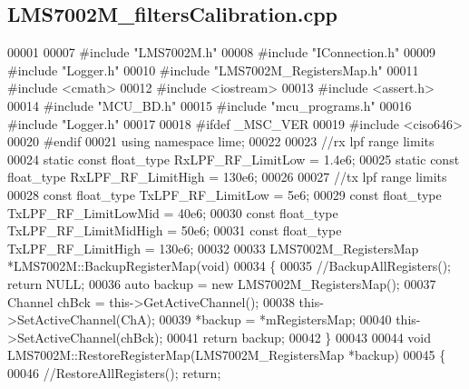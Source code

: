 \subsection{L\+M\+S7002\+M\+\_\+filters\+Calibration.\+cpp}
\label{LMS7002M__filtersCalibration_8cpp_source}

\begin{DoxyCode}
00001 
00007 \textcolor{preprocessor}{#include "LMS7002M.h"}
00008 \textcolor{preprocessor}{#include "IConnection.h"}
00009 \textcolor{preprocessor}{#include "Logger.h"}
00010 \textcolor{preprocessor}{#include "LMS7002M_RegistersMap.h"}
00011 \textcolor{preprocessor}{#include <cmath>}
00012 \textcolor{preprocessor}{#include <iostream>}
00013 \textcolor{preprocessor}{#include <assert.h>}
00014 \textcolor{preprocessor}{#include "MCU_BD.h"}
00015 \textcolor{preprocessor}{#include "mcu_programs.h"}
00016 \textcolor{preprocessor}{#include "Logger.h"}
00017 
00018 \textcolor{preprocessor}{#ifdef \_MSC\_VER}
00019 \textcolor{preprocessor}{#include <ciso646>}
00020 \textcolor{preprocessor}{#endif}
00021 \textcolor{keyword}{using namespace }lime;
00022 
00023 \textcolor{comment}{//rx lpf range limits}
00024 \textcolor{keyword}{static} \textcolor{keyword}{const} float_type RxLPF_RF_LimitLow = 1.4e6;
00025 \textcolor{keyword}{static} \textcolor{keyword}{const} float_type RxLPF_RF_LimitHigh = 130e6;
00026 
00027 \textcolor{comment}{//tx lpf range limits}
00028 \textcolor{keyword}{const} float_type TxLPF_RF_LimitLow = 5e6;
00029 \textcolor{keyword}{const} float_type TxLPF_RF_LimitLowMid = 40e6;
00030 \textcolor{keyword}{const} float_type TxLPF_RF_LimitMidHigh = 50e6;
00031 \textcolor{keyword}{const} float_type TxLPF_RF_LimitHigh = 130e6;
00032 
00033 LMS7002M_RegistersMap *LMS7002M::BackupRegisterMap(\textcolor{keywordtype}{void})
00034 \{
00035     \textcolor{comment}{//BackupAllRegisters(); return NULL;}
00036     \textcolor{keyword}{auto} backup = \textcolor{keyword}{new} LMS7002M_RegistersMap();
00037     Channel chBck = this->GetActiveChannel();
00038     this->SetActiveChannel(ChA);
00039     *backup = *mRegistersMap;
00040     this->SetActiveChannel(chBck);
00041     \textcolor{keywordflow}{return} backup;
00042 \}
00043 
00044 \textcolor{keywordtype}{void} LMS7002M::RestoreRegisterMap(LMS7002M_RegistersMap *backup)
00045 \{
00046     \textcolor{comment}{//RestoreAllRegisters(); return;}

\end{DoxyCode}
